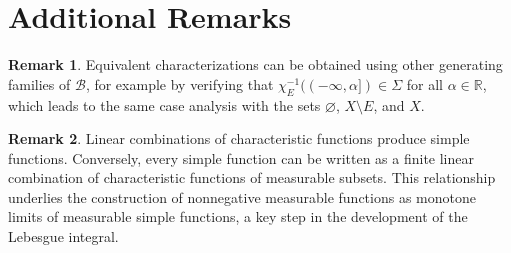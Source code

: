 \documentclass[12pt]{article}
\theoremstyle{plain}
\theoremstyle{definition}
\newtheorem{remark}{Remark}
\newcommand{\R}{\mathbb{R}}
\newcommand{\B}{\mathcal{B}}
\newcommand{\Sig}{\Sigma}
\begin{document}
\section*{Additional Remarks}
\begin{remark}
Equivalent characterizations can be obtained using other generating families of \(\B\), for example by verifying that \(\chi_E^{-1}((-\infty,\alpha]) \in \Sig\) for all \(\alpha\in\R\), which leads to the same case analysis with the sets \(\varnothing\), \(X\setminus E\), and \(X\).
\end{remark}

\begin{remark}
Linear combinations of characteristic functions produce simple functions. Conversely, every simple function can be written as a finite linear combination of characteristic functions of measurable subsets. This relationship underlies the construction of nonnegative measurable functions as monotone limits of measurable simple functions, a key step in the development of the Lebesgue integral.
\end{remark}
\end{document}
